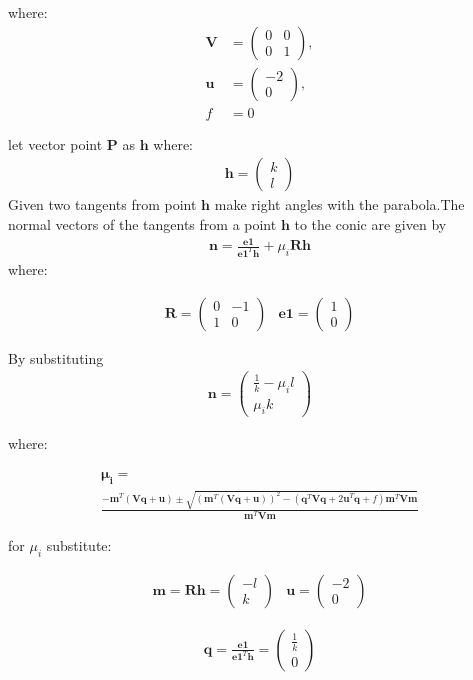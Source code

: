 \documentclass[journal,10pt,twocolumn]{article}
\let\vec\mathbf
\newcommand{\myvec}[1]{\ensuremath{\begin{pmatrix}#1\end{pmatrix}}}
\begin{document}
where:
\begin{align}
	\label{eq:V_matrix}
	\vec{V} &= \myvec{0 & 0\\0 & 1},
	\\
	\label{eq:u_vector}
	\vec{u} &= \myvec{-2\\0},
	\\
	\label{eq:f_value}
	f &= 0
\end{align}

let vector point $\vec{P}$ as $\vec{h}$
where:
\begin{eqnarray*}
\vec{h}=\myvec{k\\l}
\end{eqnarray*}
Given two tangents from  point $\vec{h}$ make right angles with the parabola.The normal vectors of the tangents from a point $\vec{h}$ to the conic are given by
\begin{eqnarray}
\vec{n}=\frac{\vec{e1}}{\vec{e1}^T\vec{h}}+\mu_i \vec{R}\vec{h}
\end{eqnarray}
\vspace*{10mm}
where:

 \begin{eqnarray*}
	\vec{R}=\myvec{0 & -1 \\ 1 & 0} &  \vec{e1}=\myvec{1 \\ 0}
\end{eqnarray*}
 
By substituting 
\begin{eqnarray}
	\vec{n}=\myvec{\frac{1}{k}-\mu_i{l} \\ \mu_i k}
\end{eqnarray}


where:

\begin{multline*}
\vec{\mu_i}=\\
\frac{-\vec{m}^T(\vec{V}\vec{q}+\vec{u})\pm \sqrt{(\vec{m}^T(\vec{V}\vec{q}+\vec{u}))^2-(\vec{q}^T\vec{V}\vec{q}+2\vec{u}^T\vec{q}+f)\vec{m}^T\vec{V}\vec{m}}}{\vec{m}^T\vec{V}\vec{m}}
\end{multline*}


for $\mu_i$ substitute:

\begin{eqnarray*}
	\vec{m}=\vec{R}\vec{h}=\myvec{-l\\k}& \vec{u}=\myvec{-2\\0}
\end{eqnarray*}

\begin{eqnarray*}
	\vec{q}=\frac{\vec{e1}}{\vec{e1}^T\vec{h}}=\myvec{\frac{1}{k} \\ 0}
\end{eqnarray*}
\end{document}
